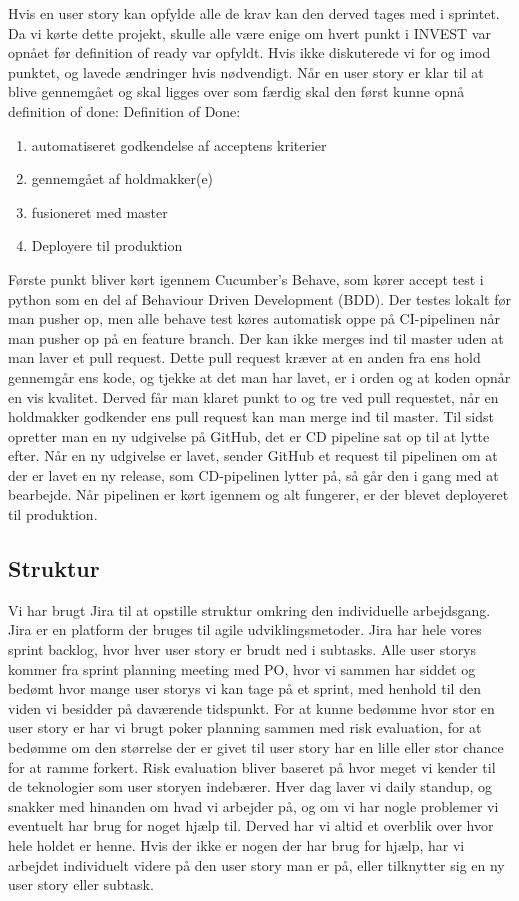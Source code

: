 \documentclass[11pt]{report}
\begin{document}
Hvis en user story kan opfylde alle de krav kan den derved tages med i sprintet. Da vi kørte dette projekt, skulle alle være enige om hvert punkt i INVEST var opnået før definition of ready var opfyldt. Hvis ikke diskuterede vi for og imod punktet, og lavede ændringer hvis nødvendigt. 
Når en user story er klar til at blive gennemgået og skal ligges over som færdig skal den først kunne opnå definition of done:
Definition of Done:

\begin{enumerate}
  \item automatiseret godkendelse af acceptens kriterier
  \item gennemgået af holdmakker(e)
  \item fusioneret med master
  \item Deployere til produktion
\end{enumerate} 

Første punkt bliver kørt igennem Cucumber’s Behave, som kører accept test i python 
som en del af Behaviour Driven Development (BDD). Der testes lokalt før man pusher op, 
men alle behave test køres automatisk oppe på CI-pipelinen når man pusher op på en feature branch. 
Der kan ikke merges ind til master uden at man laver et pull request. 
Dette pull request kræver at en anden fra ens hold gennemgår ens kode, og tjekke at det man har lavet, 
er i orden og at koden opnår en vis kvalitet. Derved får man klaret punkt to og tre ved pull requestet, 
når en holdmakker godkender ens pull request kan man merge ind til master.
Til sidst opretter man en ny udgivelse på GitHub, det er CD pipeline sat op til at lytte efter. 
Når en ny udgivelse er lavet, sender GitHub et request til pipelinen om at der er lavet en ny release, 
som CD-pipelinen lytter på, så går den i gang med at bearbejde. Når pipelinen er kørt igennem og alt fungerer, 
er der blevet deployeret til produktion. 

\subsection*{Struktur}
Vi har brugt Jira til at opstille struktur omkring den individuelle arbejdsgang. Jira er en platform der bruges 
til agile udviklingsmetoder. Jira har hele vores sprint backlog, hvor hver user story er brudt ned i subtasks. 
Alle user storys kommer fra sprint planning meeting med PO, hvor vi sammen har siddet og bedømt hvor mange user 
storys vi kan tage på et sprint, med henhold til den viden vi besidder på daværende tidspunkt. 
For at kunne bedømme hvor stor en user story er har vi brugt poker planning sammen med risk evaluation, 
for at bedømme om den størrelse der er givet til user story har en lille eller stor chance for at ramme forkert. 
Risk evaluation bliver baseret på hvor meget vi kender til de teknologier som user storyen indebærer. 
Hver dag laver vi daily standup, og snakker med hinanden om hvad vi arbejder på, og om vi har nogle problemer 
vi eventuelt har brug for noget hjælp til. Derved har vi altid et overblik over hvor hele holdet er henne. 
Hvis der ikke er nogen der har brug for hjælp, har vi arbejdet individuelt videre på den user story man er på, eller tilknytter sig en ny user story eller subtask.
\end{document}
